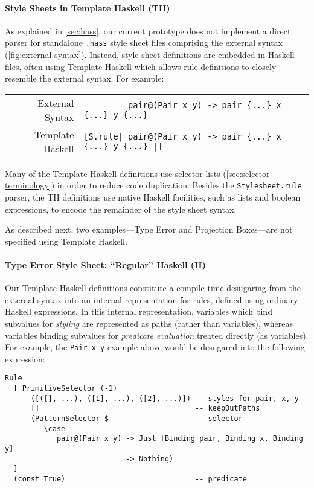 \documentclass[acmsmall, screen]{acmart}
\newcommand{\parahead}[1]
  {\paragraph{\textbf{#1}}}
\begin{document}
\parahead{Style Sheets in Template Haskell (TH)}

As explained in \autoref{sec:hass}, our current prototype does not implement a direct parser for standalone \verb+.hass+ style sheet files comprising the external syntax (\autoref{fig:external-syntax}).
Instead, style sheet definitions are embedded in Haskell files, often using Template Haskell which allows rule definitions to closely resemble the external syntax. For example: 

\vspace{0.08in}

\begin{center}
\begin{tabular}{rl}
External Syntax &
  {\small\verb+         pair@(Pair x y) -> pair {...} x {...} y {...}+}
\\[4pt]
Template Haskell &
  {\small\verb+[S.rule| pair@(Pair x y) -> pair {...} x {...} y {...} |]+}
\end{tabular}
\end{center}

\vspace{0.08in}

\noindent
Many of the Template Haskell definitions use selector lists (\autoref{sec:selector-terminology}) in order to reduce code duplication.
Besides the \texttt{Stylesheet.rule} parser, the TH definitions use native Haskell facilities, such as lists and boolean expressions, to encode the remainder of the style sheet syntax.

As described next, two examples---Type Error and Projection Boxes---are not specified using Template Haskell.




\parahead{Type Error Style Sheet: ``Regular'' Haskell (H)}

Our Template Haskell definitions constitute a compile-time desugaring from the external syntax into an internal representation for rules, defined using ordinary Haskell expressions.
In this internal representation, variables which bind subvalues for \emph{styling} are represented as paths (rather than variables), whereas variables binding subvalues for \emph{predicate evaluation} treated directly (as variables).
For example, the \texttt{Pair x y} example above would be desugared into the following expression:

\vspace{0.08in}

{\small
\begin{Verbatim}[xleftmargin=0.40in]
Rule
  [ PrimitiveSelector (-1)
      ([([], ...), ([1], ...), ([2], ...)]) -- styles for pair, x, y
      []                                    -- keepOutPaths
      (PatternSelector $                    -- selector
         \case
            pair@(Pair x y) -> Just [Binding pair, Binding x, Binding y]
             _              -> Nothing)
  ]
  (const True)                              -- predicate
\end{Verbatim}
}
\end{document}
